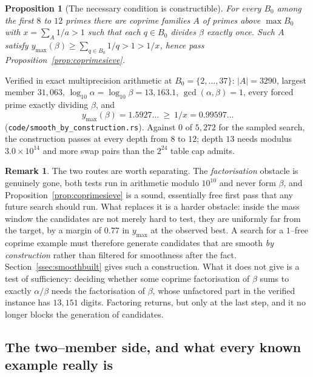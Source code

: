 \documentclass[11pt]{article}
\newtheorem{proposition}[theorem]{Proposition}
\theoremstyle{definition}
\newtheorem{remark}[theorem]{Remark}
\begin{document}
\begin{proposition}[The necessary condition is constructible]\label{prop:smoothbuilt}
For every $B_0$ among the first $8$ to $12$ primes there are coprime families $A$ of primes above
$\max B_0$ with $x=\sum_A1/a>1$ such that each $q\in B_0$ divides $\beta$ exactly once. Such $A$
satisfy $y_{\max}(\beta)\ge\sum_{q\in B_0}1/q>1>1/x$, hence pass
Proposition~\ref{prop:coprimesieve}.
\end{proposition}

Verified in exact multiprecision arithmetic at $B_0=\{2,\dots,37\}$: $|A|=3290$, largest member
$31{,}063$, $\log_{10}\alpha=\log_{10}\beta=13{,}163.1$, $\gcd(\alpha,\beta)=1$, every forced prime
exactly dividing $\beta$, and
\[ y_{\max}(\beta)=1.5927\ldots\ \ge\ 1/x=0.99597\ldots \]
\textup{(\texttt{code/smooth\_by\_construction.rs})}. Against $0$ of $5{,}272$ for the sampled
search, the construction passes at every depth from $8$ to $12$; depth $13$ needs modulus
$3.0\times10^{14}$ and more swap pairs than the $2^{24}$ table cap admits.

\begin{remark}\label{rem:coprimeverdict}
The two routes are worth separating. The \emph{factorisation} obstacle is genuinely gone, both
tests run in arithmetic modulo $10^{10}$ and never form $\beta$, and
Proposition~\ref{prop:coprimesieve} is a sound, essentially free first pass that any future search
should run. What replaces it is a harder obstacle: inside the mass window the candidates are not
merely hard to test, they are uniformly far from the target, by a margin of $0.77$ in $y_{\max}$ at
the observed best. A search for a $1$--free coprime example must therefore generate candidates that
are smooth \emph{by construction} rather than filtered for smoothness after the fact.
Section~\ref{ssec:smoothbuilt} gives such a construction. What it does not give is a test of
sufficiency: deciding whether some coprime factorisation of $\beta$ sums to exactly $\alpha/\beta$
needs the factorisation of $\beta$, whose unfactored part in the verified instance has $13{,}151$
digits. Factoring returns, but only at the last step, and it no longer blocks the generation of
candidates.
\end{remark}

\subsection{The two--member side, and what every known example really is}\label{ssec:twoside}
\end{document}
